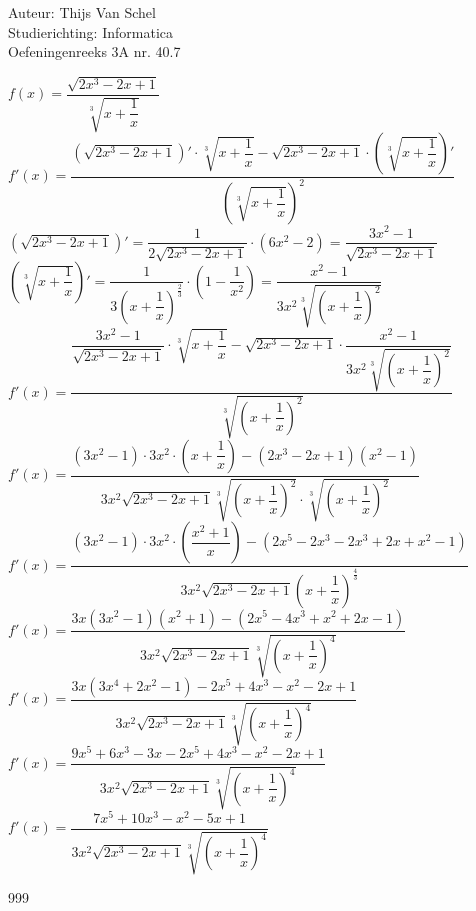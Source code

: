 \documentclass[a4paper]{article}
\begin{document}
  
\noindent \large Auteur: Thijs Van Schel\\
\noindent \large Studierichting: Informatica\\
\noindent \large Oefeningenreeks 3A nr. 40.7 \\

\medskip

\normalsize

$f(x) = \dfrac{\sqrt{2x^3-2x+1}}{\sqrt[3]{x+\dfrac{1}{x}}}$\\

$f'(x) = \dfrac{\left(\sqrt{2x^3-2x+1}\right)' \cdot \sqrt[3]{x+\dfrac{1}{x}} - \sqrt{2x^3-2x+1} \cdot \left(\sqrt[3]{x+\dfrac{1}{x}}\right)'}{\left(\sqrt[3]{x+\dfrac{1}{x}}\right)^2}$\\

$\left(\sqrt{2x^3-2x+1}\right)' = \dfrac{1}{2\sqrt{2x^3-2x+1}} \cdot (6x^2-2) = \dfrac{3x^2-1}{\sqrt{2x^3-2x+1}}$\\

$\left(\sqrt[3]{x+\dfrac{1}{x}}\right)' = \dfrac{1}{3\left(x+\dfrac{1}{x}\right)^{\tfrac{2}{3}}} \cdot \left(1-\dfrac{1}{x^2}\right) = \dfrac{x^2-1}{3x^2\sqrt[3]{\left(x+\dfrac{1}{x}\right)^2}}$\\

$f'(x) = \dfrac{\dfrac{3x^2-1}{\sqrt{2x^3-2x+1}} \cdot \sqrt[3]{x+\dfrac{1}{x}} - \sqrt{2x^3-2x+1} \cdot \dfrac{x^2-1}{3x^2\sqrt[3]{\left(x+\dfrac{1}{x}\right)^2}}}{\sqrt[3]{\left(x+\dfrac{1}{x}\right)^2}}$\\

$f'(x) = \dfrac{(3x^2-1) \cdot 3x^2 \cdot \left(x+\dfrac{1}{x}\right) - (2x^3-2x+1)(x^2-1)}{3x^2\sqrt{2x^3-2x+1}\sqrt[3]{\left(x+\dfrac{1}{x}\right)^2} \cdot \sqrt[3]{\left(x+\dfrac{1}{x}\right)^2}}$\\

$f'(x) = \dfrac{(3x^2-1) \cdot 3x^2 \cdot \left(\dfrac{x^2+1}{x}\right) - (2x^5-2x^3-2x^3+2x+x^2-1)}{3x^2\sqrt{2x^3-2x+1}\left(x+\dfrac{1}{x}\right)^{\tfrac{4}{3}}}$\\

$f'(x) = \dfrac{3x(3x^2-1)(x^2+1) - (2x^5-4x^3+x^2+2x-1)}{3x^2\sqrt{2x^3-2x+1}\sqrt[3]{\left(x+\dfrac{1}{x}\right)^4}}$\\

$f'(x) = \dfrac{3x(3x^4+2x^2-1) - 2x^5+4x^3-x^2-2x+1}{3x^2\sqrt{2x^3-2x+1}\sqrt[3]{\left(x+\dfrac{1}{x}\right)^4}}$\\

$f'(x) = \dfrac{9x^5+6x^3-3x - 2x^5+4x^3-x^2-2x+1}{3x^2\sqrt{2x^3-2x+1}\sqrt[3]{\left(x+\dfrac{1}{x}\right)^4}}$\\

$f'(x) = \dfrac{7x^5+10x^3-x^2-5x+1}{3x^2\sqrt{2x^3-2x+1}\sqrt[3]{\left(x+\dfrac{1}{x}\right)^4}}$\\

\begin{thebibliography}{999}
\end{thebibliography}
\end{document}
